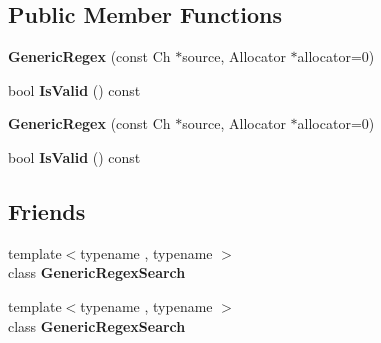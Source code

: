 \subsection*{Public Member Functions}
\begin{DoxyCompactItemize}
\item 
{\bfseries Generic\+Regex} (const Ch $\ast$source, Allocator $\ast$allocator=0)\hypertarget{classinternal_1_1_generic_regex_a35c3a49bc4545a991ab039858227df0f}{}\label{classinternal_1_1_generic_regex_a35c3a49bc4545a991ab039858227df0f}

\item 
bool {\bfseries Is\+Valid} () const \hypertarget{classinternal_1_1_generic_regex_acce12e41182cab937b6405e16f28941f}{}\label{classinternal_1_1_generic_regex_acce12e41182cab937b6405e16f28941f}

\item 
{\bfseries Generic\+Regex} (const Ch $\ast$source, Allocator $\ast$allocator=0)\hypertarget{classinternal_1_1_generic_regex_a35c3a49bc4545a991ab039858227df0f}{}\label{classinternal_1_1_generic_regex_a35c3a49bc4545a991ab039858227df0f}

\item 
bool {\bfseries Is\+Valid} () const \hypertarget{classinternal_1_1_generic_regex_acce12e41182cab937b6405e16f28941f}{}\label{classinternal_1_1_generic_regex_acce12e41182cab937b6405e16f28941f}

\end{DoxyCompactItemize}
\subsection*{Friends}
\begin{DoxyCompactItemize}
\item 
{\footnotesize template$<$typename , typename $>$ }\\class {\bfseries Generic\+Regex\+Search}\hypertarget{classinternal_1_1_generic_regex_a919008cc046ab9f1c09609f1fc143986}{}\label{classinternal_1_1_generic_regex_a919008cc046ab9f1c09609f1fc143986}

\item 
{\footnotesize template$<$typename , typename $>$ }\\class {\bfseries Generic\+Regex\+Search}\hypertarget{classinternal_1_1_generic_regex_a2a7b60188735cd8e0ed358957336baae}{}\label{classinternal_1_1_generic_regex_a2a7b60188735cd8e0ed358957336baae}

\end{DoxyCompactItemize}


